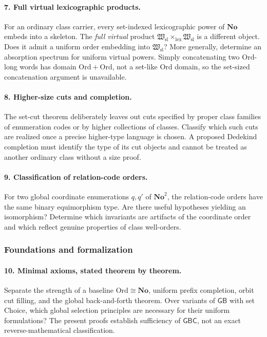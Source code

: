 \documentclass[11pt]{article}
\theoremstyle{definition}
\theoremstyle{remark}
\newcommand{\No}{\mathbf{No}}
\newcommand{\Ord}{\mathrm{Ord}}
\newcommand{\Hsl}{\mathfrak W_{\mathrm{sl}}}
\newcommand{\lex}{\mathrm{lex}}
\newcommand{\GB}{\mathsf{GB}}
\newcommand{\GBC}{\mathsf{GBC}}
\begin{document}
\paragraph{7. Full virtual lexicographic products.}
For an ordinary class carrier, every set-indexed lexicographic power
of $\No$ embeds into a skeleton. The \emph{full virtual} product
$\Hsl\times_{\lex}\Hsl$ is a different object. Does it admit a uniform
order embedding into $\Hsl$? More generally, determine an absorption
spectrum for uniform virtual powers. Simply concatenating two
$\Ord$-long words has domain $\Ord+\Ord$, not a set-like $\Ord$
domain, so the set-sized concatenation argument is unavailable.

\paragraph{8. Higher-size cuts and completion.}
The set-cut theorem deliberately leaves out cuts specified by proper
class families of enumeration codes or by higher collections of
classes. Classify which such cuts are realized once a precise
higher-type language is chosen. A proposed Dedekind completion must
identify the type of its cut objects and cannot be treated as another
ordinary class without a size proof.

\paragraph{9. Classification of relation-code orders.}
For two global coordinate enumerations $q,q'$ of $\No^2$, the
relation-code orders have the same binary equimorphism type. Are there
useful hypotheses yielding an isomorphism? Determine which invariants
are artifacts of the coordinate order and which reflect genuine
properties of class well-orders.

\subsubsection{Foundations and formalization}

\paragraph{10. Minimal axioms, stated theorem by theorem.}
Separate the strength of a baseline $\Ord\cong\No$, uniform prefix
completion, orbit cut filling, and the global back-and-forth theorem.
Over variants of $\GB$ with set Choice, which global selection
principles are necessary for their uniform formulations? The present
proofs establish sufficiency of $\GBC$, not an exact reverse-mathematical
classification.
\end{document}
